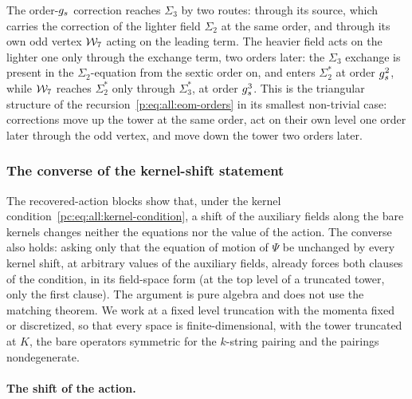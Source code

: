 The order-$g_s$ correction reaches $\Sigma_3$ by two routes: through its source, which carries the correction of the lighter field $\Sigma_2$ at the same order, and through its own odd vertex $\mathcal{W}_{7}$ acting on the leading term.
The heavier field acts on the lighter one only through the exchange term, two orders later: the $\Sigma_3$ exchange is present in the $\Sigma_2$-equation from the sextic order on, and enters $\Sigma_2^*$ at order $g_s^2$, while $\mathcal{W}_{7}$ reaches $\Sigma_2^*$ only through $\Sigma_3^*$, at order $g_s^3$.
This is the triangular structure of the recursion~\eqref{p:eq:all:eom-orders} in its smallest non-trivial case: corrections move up the tower at the same order, act on their own level one order later through the odd vertex, and move down the tower two orders later.

\subsubsection{The converse of the kernel-shift statement}
\label{ch3:sec:converse}

The recovered-action blocks show that, under the kernel condition~\eqref{pc:eq:all:kernel-condition}, a shift of the auxiliary fields along the bare kernels changes neither the equations nor the value of the action.
The converse also holds: asking only that the equation of motion of $\Psi$ be unchanged by every kernel shift, at arbitrary values of the auxiliary fields, already forces both clauses of the condition, in its field-space form (at the top level of a truncated tower, only the first clause).
The argument is pure algebra and does not use the matching theorem.
We work at a fixed level truncation with the momenta fixed or discretized, so that every space is finite-dimensional, with the tower truncated at $K$, the bare operators symmetric for the $k$-string pairing and the pairings nondegenerate.

\paragraph{The shift of the action.}

